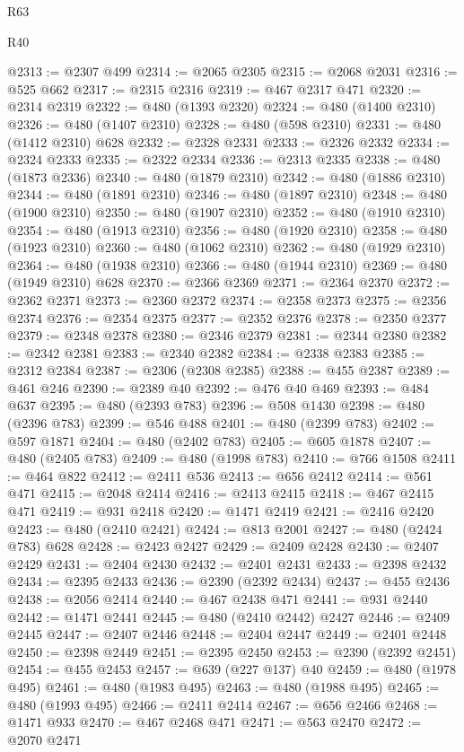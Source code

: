\begin{lexlean}{R63}
\begin{lexlean}{R40}
\begin{coremodule}
{{{{{{{{{{{{{{{{{{{{{{{{{{{{{{{{{{{{{{{{{{{{{{{{{{{{{{{{{{{{{{{{{{{{{{{{{{{{{{{{{{{{{{{{{{{{{{{{{{{{{{{{{{{{{@2313 := @2307 @499
@2314 := @2065 @2305
@2315 := @2068 @2031
@2316 := @525 @662
@2317 := @2315 @2316
@2319 := @467 @2317 @471
@2320 := @2314 @2319
@2322 := @480 (@1393 @2320)
@2324 := @480 (@1400 @2310)
@2326 := @480 (@1407 @2310)
@2328 := @480 (@598 @2310)
@2331 := @480 (@1412 @2310) @628
@2332 := @2328 @2331
@2333 := @2326 @2332
@2334 := @2324 @2333
@2335 := @2322 @2334
@2336 := @2313 @2335
@2338 := @480 (@1873 @2336)
@2340 := @480 (@1879 @2310)
@2342 := @480 (@1886 @2310)
@2344 := @480 (@1891 @2310)
@2346 := @480 (@1897 @2310)
@2348 := @480 (@1900 @2310)
@2350 := @480 (@1907 @2310)
@2352 := @480 (@1910 @2310)
@2354 := @480 (@1913 @2310)
@2356 := @480 (@1920 @2310)
@2358 := @480 (@1923 @2310)
@2360 := @480 (@1062 @2310)
@2362 := @480 (@1929 @2310)
@2364 := @480 (@1938 @2310)
@2366 := @480 (@1944 @2310)
@2369 := @480 (@1949 @2310) @628
@2370 := @2366 @2369
@2371 := @2364 @2370
@2372 := @2362 @2371
@2373 := @2360 @2372
@2374 := @2358 @2373
@2375 := @2356 @2374
@2376 := @2354 @2375
@2377 := @2352 @2376
@2378 := @2350 @2377
@2379 := @2348 @2378
@2380 := @2346 @2379
@2381 := @2344 @2380
@2382 := @2342 @2381
@2383 := @2340 @2382
@2384 := @2338 @2383
@2385 := @2312 @2384
@2387 := @2306 (@2308 @2385)
@2388 := @455 @2387
@2389 := @461 @246
@2390 := @2389 @40
@2392 := @476 @40 @469
@2393 := @484 @637
@2395 := @480 (@2393 @783)
@2396 := @508 @1430
@2398 := @480 (@2396 @783)
@2399 := @546 @488
@2401 := @480 (@2399 @783)
@2402 := @597 @1871
@2404 := @480 (@2402 @783)
@2405 := @605 @1878
@2407 := @480 (@2405 @783)
@2409 := @480 (@1998 @783)
@2410 := @766 @1508
@2411 := @464 @822
@2412 := @2411 @536
@2413 := @656 @2412
@2414 := @561 @471
@2415 := @2048 @2414
@2416 := @2413 @2415
@2418 := @467 @2415 @471
@2419 := @931 @2418
@2420 := @1471 @2419
@2421 := @2416 @2420
@2423 := @480 (@2410 @2421)
@2424 := @813 @2001
@2427 := @480 (@2424 @783) @628
@2428 := @2423 @2427
@2429 := @2409 @2428
@2430 := @2407 @2429
@2431 := @2404 @2430
@2432 := @2401 @2431
@2433 := @2398 @2432
@2434 := @2395 @2433
@2436 := @2390 (@2392 @2434)
@2437 := @455 @2436
@2438 := @2056 @2414
@2440 := @467 @2438 @471
@2441 := @931 @2440
@2442 := @1471 @2441
@2445 := @480 (@2410 @2442) @2427
@2446 := @2409 @2445
@2447 := @2407 @2446
@2448 := @2404 @2447
@2449 := @2401 @2448
@2450 := @2398 @2449
@2451 := @2395 @2450
@2453 := @2390 (@2392 @2451)
@2454 := @455 @2453
@2457 := @639 (@227 @137) @40
@2459 := @480 (@1978 @495)
@2461 := @480 (@1983 @495)
@2463 := @480 (@1988 @495)
@2465 := @480 (@1993 @495)
@2466 := @2411 @2414
@2467 := @656 @2466
@2468 := @1471 @933
@2470 := @467 @2468 @471
@2471 := @563 @2470
@2472 := @2070 @2471
}}}}}}}}}}}}}}}}}}}}}}}}}}}}}}}}}}}}}}}}}}}}}}}}}}}}}}}}}}}}}}}}}}}}}}}}}}}}}}}}}}}}}}}}}}}}}}}}}}}}}}}}}}}}}
\end{coremodule}
\end{lexlean}
\end{lexlean}
